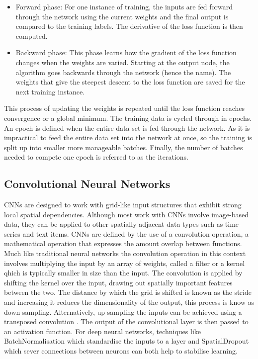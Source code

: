 \documentclass[12pt]{iopart}
\begin{document}
\begin{itemize}
\item Forward phase: For one instance of training, the inputs are fed forward through the network using the current weights and the final output is compared to the training labels. The derivative of the loss function is then computed.
\item Backward phase: This phase learns how the gradient of the loss function changes when the weights are varied. Starting at the output node, the algorithm goes backwards through the network (hence the name). The weights that give the steepest descent to the loss function are saved for the next training instance.  
\end{itemize}
This process of updating the weights is repeated until the loss function reaches convergence or a global minimum. The training data is cycled through in epochs. An epoch is defined when the entire data set is fed through the network. As it is impractical to feed the entire data set into the network at once, so the training is split up into smaller more manageable batches. Finally, the number of batches needed to compete one epoch is referred to as the iterations.


\subsection{Convolutional Neural Networks}
%
\acp{CNN} are designed to work with grid-like input structures that exhibit
strong local spatial dependencies. Although most work with \acp{CNN}
involve image-based data, they can be applied to other spatially adjacent data
types such as time-series and text items. \acp{CNN} are defined by the use of a
convolution operation, a mathematical operation that expresses the amount
overlap between functions. Much like traditional neural networks the convolution operation in this context involves multiplying the input by an array of weights, called a filter or a kernel qhich is typically smaller in size than the input. The convolution is applied by shifting the kernel over the input, drawing out spatially important features between the
two. The distance by which the grid is shifted is known as
the stride and increasing it reduces the dimensionality of the
output, this process is know as down sampling. Alternatively, up sampling the inputs can be achieved using a transposed convolution \cite{dumoulin2016guide}.   The output of the convolutional layer is then passed to an activation function. For deep neural networks, techniques like BatchNormalisation \cite{ioffe2015batch} which standardise the inputs to a layer and SpatialDropout \cite{tompson2014efficient} which sever connections between neurons can both help to stabilise learning.  
\end{document}
